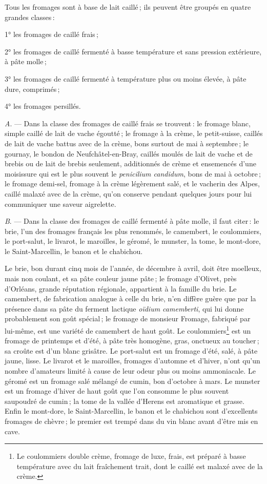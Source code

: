 Tous les fromages sont à base de lait caillé ; ils peuvent être groupés en
quatre grandes classes :

1° les fromages de caillé frais ;

2° les fromages de caillé fermenté à basse température et sans pression
extérieure, à pâte molle ;

3° les fromages de caillé fermenté à température plus ou moins élevée, à pâte
dure, comprimés ;

4° les fromages persillés.

\medskip

\textit{A}. — Dans la classe des fromages de caillé frais se trouvent : le
fromage blanc, simple caillé de lait de vache égoutté ; le fromage à la crème,
le petit-suisse, caillés de lait de vache battus avec de la crème, bons surtout
de mai à septembre ; le gournay, le bondon de Neufchâtel-en-Bray, caillés
moulés de lait de vache et de brebis ou de lait de brebis seulement,
additionnés de crème et ensemencés d'une moisissure qui est le plus souvent le
\textit{penicilium candidum}, bons de mai à octobre ; le fromage demi-sel,
fromage à la crème légèrement salé, et le vacherin des Alpes, caillé malaxé
avec de la crème, qu'on conserve pendant quelques jours pour lui communiquer
une saveur aigrelette.

\medskip

\textit{B}. — Dans la classe des fromages de caillé fermenté à pâte molle, il
faut citer : le brie, l'un des fromages français les plus renommés, le
camembert, le coulommiers, le port-salut, le livarot, le maroilles, le géromé,
le munster, la tome, le mont-dore, le Saint-Marcellin, le banon et le
chabichou.

Le brie, bon durant cinq mois de l’année, de décembre à avril, doit être
moelleux, mais non coulant, et sa pâte couleur jaune pâte ; le fromage
d'Olivet, près d'Orléans, grande réputation régionale, appartient à la famille
du brie. Le camembert, de fabrication analogue à celle du brie, n'en diffère
guère que par la présence dans sa pâte du ferment lactique \textit{oïdium
camemberti}, qui lui donne probablement son goût spécial ; le fromage de
monsieur Fromage, fabriqué par lui-même, est une variété de camembert de haut
goût. Le coulommiers\footnote{Le coulommiers double crème, fromage de luxe,
frais, est préparé à basse température avec du lait fraîchement trait, dont le
caillé est malaxé avec de la crème.} est un fromage de printemps et d'été,
à pâte très homogène, gras, onctueux au toucher ; sa croûte est d’un blanc
grisâtre. Le port-salut est un fromage d'été, salé, à pâte jaune, lisse. Le
livarot et le maroilles, fromages d'automne et d'hiver, n'ont qu'un nombre
d'amateurs limité à cause de leur odeur plus ou moins ammoniacale. Le géromé
est un fromage salé mélangé de cumin, bon d'octobre à mars. Le munster est un
fromage d'hiver de haut goût que l'on consomme le plus souvent saupoudré de
cumin ; la tome de la vallée d'Herens est aromatique et grasse. Enfin le
mont-dore, le Saint-Marcellin, le banon et le chabichou sont d'excellents
fromages de chèvre ; le premier est trempé dans du vin blanc avant d'être mis
en cave.

